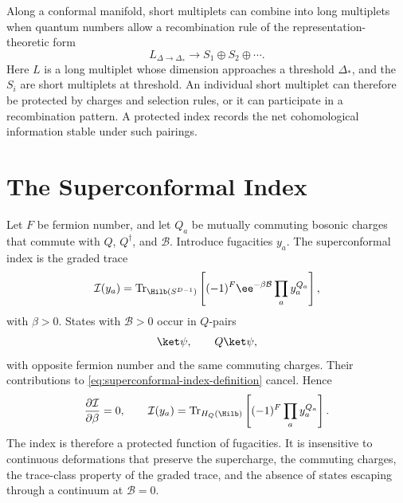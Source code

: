 Along a conformal manifold, short multiplets can combine into long multiplets
when quantum numbers allow a recombination rule of the representation-theoretic
form
\[
  L_{\Delta\to\Delta_*}
  \longrightarrow
  S_1\oplus S_2\oplus\cdots .
\]
Here \(L\) is a long multiplet whose dimension approaches a threshold
\(\Delta_*\), and the \(S_i\) are short multiplets at threshold.  An individual
short multiplet can therefore be protected by charges and selection rules, or
it can participate in a recombination pattern.  A protected index records the
net cohomological information stable under such pairings.

\section{The Superconformal Index}

Let \(F\) be fermion number, and let \(Q_a\) be mutually commuting bosonic
charges that commute with \(Q\), \(Q^\dagger\), and \(\mathcal B\).  Introduce
fugacities \(y_a\).  The superconformal index is the graded trace
\begin{equation}
  \mathcal I(y_a)
  =
  \operatorname{Tr}_{\Hilb(S^{D-1})}
  \left[
    (-1)^F
    \ee^{-\beta\mathcal B}
    \prod_a y_a^{Q_a}
  \right],
  \label{eq:superconformal-index-definition}
\end{equation}
with \(\beta>0\).  States with \(\mathcal B>0\) occur in \(Q\)-pairs
\[
  \ket\psi,\qquad Q\ket\psi,
\]
with opposite fermion number and the same commuting charges.  Their
contributions to \eqref{eq:superconformal-index-definition} cancel.  Hence
\[
  \frac{\partial\mathcal I}{\partial\beta}=0,
  \qquad
  \mathcal I(y_a)
  =
  \operatorname{Tr}_{H_Q(\Hilb)}
  \left[
    (-1)^F\prod_a y_a^{Q_a}
  \right].
\]
The index is therefore a protected function of fugacities.  It is insensitive
to continuous deformations that preserve the supercharge, the commuting
charges, the trace-class property of the graded trace, and the absence of
states escaping through a continuum at \(\mathcal B=0\).

